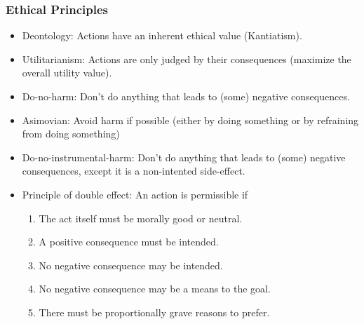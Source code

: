 \documentclass[UTF8,11pt,colorlinks,compress,openany]{beamer}%
\begin{document}
\begin{frame}\frametitle{Ethical Principles}
\begin{itemize}
	\item Deontology: Actions have an inherent ethical value (Kantiatism).
	\item Utilitarianism: Actions are only judged by their consequences (maximize the overall utility value).
	\item Do-no-harm: Don't do anything that leads to (some) negative consequences.
	\item Asimovian: Avoid harm if possible (either by doing something or by refraining from doing something)
	\item Do-no-instrumental-harm: Don't do anything that leads to (some) negative consequences, except it is a non-intented side-effect.
	\item Principle of double effect: An action is permissible if
	\begin{enumerate}
		\item The act itself must be morally good or neutral.
		\item A positive consequence must be intended.
		\item No negative consequence may be intended.
		\item No negative consequence may be a means to the goal.
		\item There must be proportionally grave reasons to prefer.
	\end{enumerate}
\end{itemize}
\end{frame}
\end{document}
